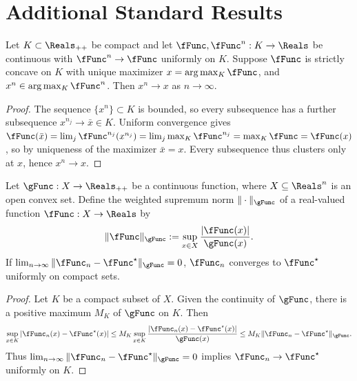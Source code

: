 \documentclass[\econtexRoot/BufferStockTheory]{subfiles}
\begin{document}
\section{Additional Standard Results}\label{sec:realanalysis}


\begin{proposition}
Let $K \subset \Reals_{++}$ be compact and let $\fFunc, \fFunc^{n}: K \to \Reals$ be continuous with $\fFunc^{n} \to \fFunc$ uniformly on $K$. Suppose $\fFunc$ is strictly concave on $K$ with unique maximizer $x = \arg\max_{K}\fFunc$, and $x^{n} \in \arg\max_{K}\fFunc^{n}$. Then $x^{n} \to x$ as $n \to \infty$.
\end{proposition}
\begin{proof}
The sequence $\{x^{n}\}\subset K$ is bounded, so every subsequence has a further subsequence $x^{n_{j}}\to \bar{x}\in K$. Uniform convergence gives $\fFunc(\bar{x}) = \lim_{j}\fFunc^{n_{j}}(x^{n_{j}}) = \lim_{j}\max_{K}\fFunc^{n_{j}} = \max_{K}\fFunc = \fFunc(x)$, so by uniqueness of the maximizer $\bar{x}=x$. Every subsequence thus clusters only at $x$, hence $x^{n}\to x$.
\end{proof}

\begin{fact}\label{fact:normimpliescompact}
Let $\gFunc: X \to \Reals_{++}$ be a continuous function, where $X \subseteq \Reals^{n}$ is an open convex set.
Define the weighted supremum norm $\Vert\cdot \Vert_{\gFunc}$ of a real-valued function $\fFunc: X \to \Reals$ by
\begin{equation}
\Vert \fFunc \Vert_\gFunc := \sup_{x \in X} \frac{\vert \fFunc(x)\vert }{\gFunc(x)}.
\end{equation}
If $\lim_{n \to \infty} \Vert \fFunc_n - \fFunc^{\star} \Vert_\gFunc = 0$, $\fFunc_n$ converges to $\fFunc^{\star}$ uniformly on compact sets.
\end{fact}
\begin{proof}
Let $K$ be a compact subset of $X$. Given the continuity of $\gFunc$, there is a positive maximum $M_K$ of $\gFunc$ on $K$. Then
\begin{equation}
\sup_{x \in K} \vert \fFunc_n(x) - \fFunc^{\star}(x)\vert  \leq M_K \sup_{x \in K} \frac{\vert \fFunc_n(x) - \fFunc^{\star}(x)\vert }{\gFunc(x)} \leq M_K \Vert \fFunc_n - \fFunc^{\star} \Vert_\gFunc.
\end{equation}
Thus $\lim_{n \to \infty} \Vert \fFunc_n - \fFunc^{\star} \Vert_\gFunc = 0$ implies $\fFunc_n\to\fFunc^{\star}$ uniformly on $K$.
\end{proof}
\end{document}
